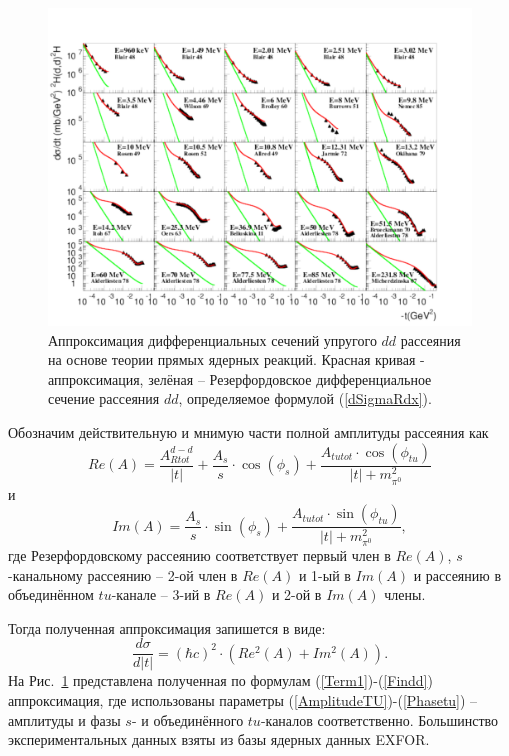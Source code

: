 \documentclass[a4paper,12pt]{article}
\begin{document}
\begin{large}
\begin{figure}[ht]
   \centering
   \includegraphics[width=0.95\linewidth]{images/dd}
   \caption{ Аппроксимация дифференциальных сечений упругого $dd$ рассеяния \cite{DD1_Blair,DD2_Wilson,DD3_Brolley,DD4_Burrows,DD5_Nemec,DD6_Rosen1,DD7_Rosen2,
  DD8_Allred,DD9_Jarmie,DD10_Okihana,DD11_Itoh,DD_Oers,DD12_Beliuskina,DD13_Alderliesten,
  DD14_Brueckmann,DD15_Micherdzinska} на основе теории прямых ядерных реакций. Красная кривая - аппроксимация, зелёная -- Резерфордовское дифференциальное сечение рассеяния $dd$, определяемое формулой (\ref{dSigmaRdx}). } 
   \label{fig:dd}
\end{figure}

Обозначим действительную и мнимую части полной амплитуды рассеяния как
\begin{equation}
  \label{Term1}
 Re(A)=\frac{A_{Rtot}^{d-d}}{|t|}+\frac{A_s}{s} \cdot \cos(\phi_{s}) + \frac{A_{tutot} \cdot \cos(\phi_{tu})}{|t|+m_{\pi^0}^2}
\end{equation}
и
\begin{equation}
  \label{Term2}
 Im(A)=\frac{A_s}{s} \cdot \sin(\phi_{s}) + \frac{A_{tutot} \cdot \sin(\phi_{tu})}{|t|+m_{\pi^0}^2},
\end{equation}
где Резерфордовскому рассеянию соответствует первый член в $Re(A)$, $s$-канальному рассеянию -- 2-ой член в $Re(A)$ и 1-ый в $Im(A)$ и рассеянию в объединённом $tu$-канале -- 3-ий в $Re(A)$ и 2-ой в $Im(A)$ члены.

Тогда полученная аппроксимация запишется в виде:
\begin{equation}
 \label{Findd}     
      \frac{d\sigma}{d|t|}=\left( \hbar c \right)^2 \cdot \left( Re^2(A)+Im^2(A) \right).
\end{equation}
  На Рис.~\ref{fig:dd} представлена полученная по формулам (\ref{Term1})-(\ref{Findd}) аппроксимация, где использованы параметры (\ref{AmplitudeTU})-(\ref{Phasetu}) -- амплитуды и фазы $s$- и объединённого $tu$-каналов соответственно. Большинство экспериментальных данных \cite{DD1_Blair,DD2_Wilson,DD3_Brolley,DD4_Burrows,DD5_Nemec,DD6_Rosen1,DD7_Rosen2,
  DD8_Allred,DD9_Jarmie,DD10_Okihana,DD11_Itoh,DD_Oers,DD12_Beliuskina,DD13_Alderliesten,
  DD14_Brueckmann,DD15_Micherdzinska} взяты из базы ядерных данных EXFOR.


\end{large}
\end{document}
